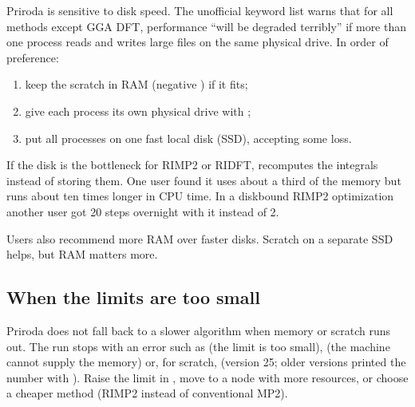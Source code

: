 \documentclass[letterpaper,10pt,english,openany,oneside]{sphinxmanual}
\begin{document}
\sphinxAtStartPar
Priroda is sensitive to disk speed. The unofficial keyword list  warns that for all methods except GGA DFT, performance
“will be degraded terribly” if more than one process reads and writes large files on the same physical drive. In
order of preference:


\begin{enumerate}
%
\item {} 
\sphinxAtStartPar
keep the scratch in RAM (negative ) if it fits;

\item {} 
\sphinxAtStartPar
give each process its own physical drive with ;

\item {} 
\sphinxAtStartPar
put all processes on one fast local disk (SSD), accepting some loss.

\end{enumerate}

\sphinxAtStartPar
If the disk is the bottleneck for RI\sphinxhyphen{}MP2 or RI\sphinxhyphen{}DFT, {\hyperref[\detokenize{reference/integral:integral-direct}]{}} recomputes the
integrals instead of storing them. One user found it uses about a third of the memory but runs about ten times
longer in CPU time. In a disk\sphinxhyphen{}bound RI\sphinxhyphen{}MP2 optimization another user got 20 steps overnight with it instead of 2.



\sphinxAtStartPar
Users also recommend more RAM over faster disks. Scratch on a separate SSD helps, but RAM matters more.




\subsection{When the limits are too small}
\label{\detokenize{start/running:when-the-limits-are-too-small}}
\sphinxAtStartPar
Priroda does not fall back to a slower algorithm when memory or scratch runs out. The run stops with an error such as
 (the  limit is too small),  (the machine cannot supply the memory)
or, for scratch,  (version 25; older versions printed the number with
). Raise the limit in , move to a node with more resources, or choose a cheaper
method (RI\sphinxhyphen{}MP2 instead of conventional MP2).
\end{document}
